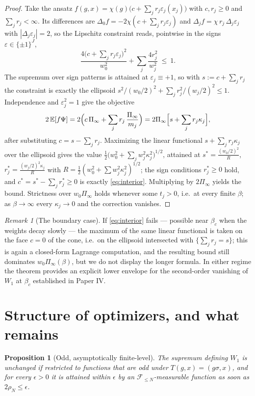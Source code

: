 \documentclass[11pt]{amsart}
\newtheorem{proposition}[theorem]{Proposition}
\theoremstyle{remark}
\newtheorem{remark}[theorem]{Remark}
\newcommand{\E}{\mathbb{E}}
\begin{document}
\begin{proof}
Take the ansatz $f(g,x)=\chi(g)\bigl(c+\sum_jr_j\varepsilon_j(x_j)\bigr)$ with
$c,r_j\ge0$ and $\sum_jr_j<\infty$. Its differences are
$\Delta_0f=-2\chi(c+\sum_jr_j\varepsilon_j)$ and
$\Delta_jf=\chi\,r_j\,\Delta_j\varepsilon_j$ with $|\Delta_j\varepsilon_j|=2$, so the
Lipschitz constraint reads, pointwise in the signs $\varepsilon\in\{\pm1\}^J$,
\[
\frac{4\bigl(c+\sum_jr_j\varepsilon_j\bigr)^2}{w_0^2}+\sum_j\frac{4r_j^2}{w_j^2}\ \le\ 1 .
\]
The supremum over sign patterns is attained at $\varepsilon_j\equiv+1$, so with
$s:=c+\sum_jr_j$ the constraint is exactly the ellipsoid
$s^2/(w_0/2)^2+\sum_jr_j^2/(w_j/2)^2\le1$. Independence and $\varepsilon_j^2=1$ give the
objective
\[
2\,\E[f\Psi]=2\Bigl(c\,\Pi_\infty+\sum_jr_j\,\frac{\Pi_\infty}{m_j}\Bigr)
=2\Pi_\infty\Bigl[s+\sum_jr_j\kappa_j\Bigr],
\]
after substituting $c=s-\sum_jr_j$. Maximizing the linear functional
$s+\sum_jr_j\kappa_j$ over the ellipsoid gives the value
$\tfrac12\bigl(w_0^2+\sum_jw_j^2\kappa_j^2\bigr)^{1/2}$, attained at
$s^*=\tfrac{(w_0/2)^2}{R}$, $r_j^*=\tfrac{(w_j/2)^2\kappa_j}{R}$ with
$R=\tfrac12(w_0^2+\sum w_j^2\kappa_j^2)^{1/2}$; the sign conditions $r_j^*\ge0$ hold, and
$c^*=s^*-\sum_jr_j^*\ge0$ is exactly \eqref{eq:interior}. Multiplying by $2\Pi_\infty$
yields the bound. Strictness over $w_0\Pi_\infty$ holds whenever some $t_j>0$, i.e.\ at
every finite $\beta$; as $\beta\to\infty$ every $\kappa_j\to0$ and the correction vanishes.
\end{proof}

\begin{remark}[The boundary case]\label{rem:boundary}
If \eqref{eq:interior} fails --- possible near $\beta_c$ when the weights decay slowly ---
the maximum of the same linear functional is taken on the face $c=0$ of the cone, i.e.\ on
the ellipsoid intersected with $\{\sum_jr_j=s\}$; this is again a closed-form Lagrange
computation, and the resulting bound still dominates $w_0\Pi_\infty(\beta)$, but we do not
display the longer formula. In either regime the theorem provides an explicit lower
envelope for the second-order vanishing of $W_1$ at $\beta_c$ established in Paper IV.
\end{remark}

\section{Structure of optimizers, and what remains}\label{sec:structure}

\begin{proposition}[Odd, asymptotically finite-level]\label{prop:structure}
The supremum defining $W_1$ is unchanged if restricted to functions that are odd under
$T(g,x)=(g\sigma,x)$, and for every $\epsilon>0$ it is attained within $\epsilon$ by an
$\mathcal F_{\le N}$-measurable function as soon as $2\rho_N\le\epsilon$.
\end{proposition}
\end{document}
